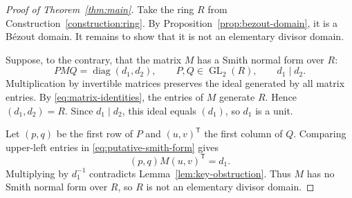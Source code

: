 \documentclass[11pt]{amsart}
\numberwithin{equation}{section}
\theoremstyle{definition}
\DeclareMathOperator{\GL}{GL}
\DeclareMathOperator{\diag}{diag}
\begin{document}
\begin{proof}[Proof of Theorem~\ref{thm:main}]
Take the ring $R$ from Construction~\ref{construction:ring}. By Proposition~\ref{prop:bezout-domain}, it is a B\'ezout domain. It remains to show that it is not an elementary divisor domain.

Suppose, to the contrary, that the matrix $M$ has a Smith normal form over $R$:
\begin{equation}\label{eq:putative-smith-form}
  PMQ=\diag(d_1,d_2),\qquad
  P,Q\in\GL_2(R),\qquad d_1\mid d_2.
\end{equation}
Multiplication by invertible matrices preserves the ideal generated by all matrix entries. By \eqref{eq:matrix-identities}, the entries of $M$ generate $R$. Hence $(d_1,d_2)=R$. Since $d_1\mid d_2$, this ideal equals $(d_1)$, so $d_1$ is a unit.

Let $(p,q)$ be the first row of $P$ and $(u,v)^{\mathsf T}$ the first column of $Q$. Comparing upper-left entries in \eqref{eq:putative-smith-form} gives
\[
  (p,q)M(u,v)^{\mathsf T}=d_1.
\]
Multiplying by $d_1^{-1}$ contradicts Lemma~\ref{lem:key-obstruction}. Thus $M$ has no Smith normal form over $R$, so $R$ is not an elementary divisor domain.
\end{proof}
\end{document}
